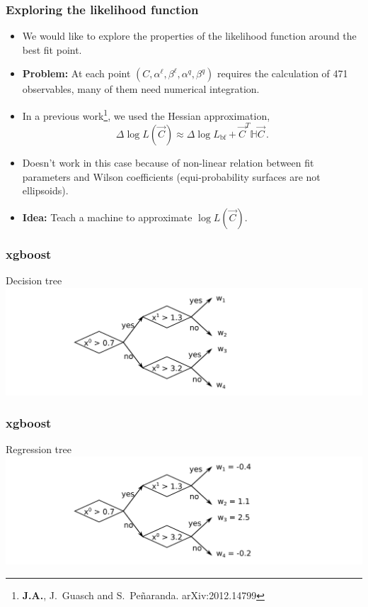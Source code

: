 \documentclass[mathserif, 10pt]{beamer}
\begin{document}
\begin{frame}
    \frametitle{Exploring the likelihood function}

    \begin{itemize}
        \item We would like to explore the properties of the likelihood function around the best fit point.
        \item {\bf Problem:} At each point $(C, \alpha^\ell, \beta^\ell, \alpha^q, \beta^q)$ requires the calculation of 471 observables, many of them need numerical integration.
        \item In a previous work\footnote[1]{\textbf{J.A.}, J.~Guasch and S.~Pe\~naranda. arXiv:2012.14799}, we used the Hessian approximation,
        $$\Delta\log L (\vec{C}) \approx \Delta\log L_\mathrm{bf} + \vec{C}^T \mathbb{H} \vec{C}\,.$$
        \item Doesn't work in this case because of non-linear relation between fit parameters and Wilson coefficients (equi-probability surfaces are not ellipsoids).
        \item {\bf Idea:} Teach a machine to approximate $\log L(\vec{C})$.
    \end{itemize}

\end{frame}

\begin{frame}
    \frametitle{xgboost}

    Decision tree
    \includegraphics[width=\textwidth]{figures/dectree.png}

\end{frame}

\begin{frame}
    \frametitle{xgboost}

    Regression tree
    \includegraphics[width=\textwidth]{figures/regtree_nof.png}

\end{frame}
\end{document}
